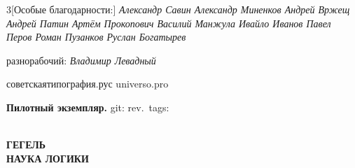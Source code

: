 \documentclass[a5paper, 10pt, twoside, onecolumn, openany]{memoir}
\begin{document}
\begin{footnotesize}
\begin{multicols}{3}[\noindent Особые благодарности:\vspace{-3ex}]
    \noindent\em
    Александр Савин\newline
    Александр Миненков\newline
    Андрей Вржещ\newline
    Андрей Патин\newline
    Артём Прокопович\newline
    Василий Манжула\newline
    Ивайло Иванов\newline
    Павел Перов\newline
    Роман Пузанков\newline
    Руслан Богатырев\newline
    \newline
    \newline
    \newline
  \end{multicols}
  \vspace{-4.0ex}
   разнорабочий: \textit{Владимир Левадный}

  \vfil

  \noindent советскаятипография.рус {\tiny{}} universo.pro

  \vfil

  \noindent\textbf{Пилотный экземпляр.}
  \hfill{git: rev.\gitAbbrevHash\gitDirty\ tags: \gitTags}
\end{footnotesize}

\clearpage

\pagestyle{simple}
\setcounter{page}{1}
\renewcommand{\parttitlefont}{\Huge\color{white}}


\cleardoublepage

\mainmatter
\thispagestyle{plainfullpagecover}
{\centering\color{white}
  \ \\
  \vspace{50mm}
  {\huge\bfseries ГЕГЕЛЬ} \\
  \vspace{50mm}
  {\Huge\bfseries НАУКА ЛОГИКИ}
\par}

\end{document}
